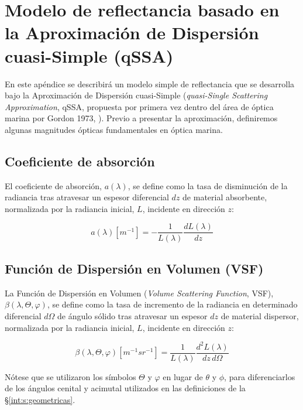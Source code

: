 \chapter[Modelo de reflectancia qSSA]{Modelo de reflectancia basado en la Aproximación de Dispersión cuasi-Simple (qSSA)}
\label{qssa}

En este apéndice se describirá un modelo simple de reflectancia que se desarrolla bajo la Aproximación de Dispersión cuasi-Simple (\textit{quasi-Single Scattering Approximation}, qSSA, propuesta por primera vez dentro del área de óptica marina por Gordon 1973, \cite{gordon1973}). Previo a presentar la aproximación, definiremos algunas magnitudes ópticas fundamentales en óptica marina.

\section{Coeficiente de absorción}
\label{qssa:s:a}
    
    El coeficiente de absorción, $a(\lambda)$, se define como la tasa de disminución de la radiancia tras atravesar un espesor diferencial $dz$ de material absorbente, normalizada por la radiancia inicial, $L$, incidente en dirección $z$:
    
    \begin{equation}
        a(\lambda)[m^{-1}] = -\frac{1}{L(\lambda)}\frac{dL(\lambda)}{dz}
        \label{qssa:eq:a}
    \end{equation}

\section{Función de Dispersión en Volumen (VSF)}
\label{qssa:s:vsf}

    La Función de Dispersión en Volumen (\textit{Volume Scattering Function}, VSF), $\beta(\lambda,\Theta,\varphi)$, se define como la tasa de incremento de la radiancia en determinado diferencial $d\Omega$ de ángulo sólido tras atravesar un espesor $dz$ de material dispersor, normalizada por la radiancia inicial, $L$, incidente en dirección $z$:

    \begin{equation}
        \beta(\lambda,\Theta,\varphi)[m^{-1}sr^{-1}] = \frac{1}{L(\lambda)}\frac{d^{2}L(\lambda)}{dz\,d\Omega}
        \label{qssa:eq:vsf}
    \end{equation}

    Nótese que se utilizaron los símbolos $\Theta$ y $\varphi$ en lugar de $\theta$ y $\phi$, para diferenciarlos de los ángulos cenital y acimutal utilizados en las definiciones de la \S \ref{int:s:geometricas}.

